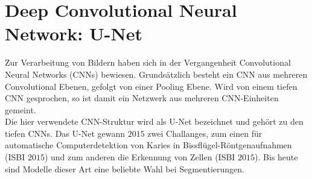 \section{Deep Convolutional Neural Network: U-Net}
\label{sec:Model}
Zur Verarbeitung von Bildern haben sich in der Vergangenheit Convolutional Neural Networks (CNNs) bewiesen.
Grundsätzlich besteht ein CNN aus mehreren Convolutional Ebenen, gefolgt von einer Pooling Ebene.
Wird von einem tiefen CNN gesprochen, so ist damit ein Netzwerk aus mehreren CNN-Einheiten gemeint.
\\
Die hier verwendete CNN-Struktur wird als U-Net bezeichnet und gehört zu den tiefen CNNs.
Das U-Net gewann $2015$ zwei Challanges, zum einen für automatische Computerdetektion von Karies in Bissflügel-Röntgenaufnahmen (ISBI $2015$) und zum anderen die Erkennung von Zellen (ISBI $2015$).\cite{RFB15a}
Bis heute sind Modelle dieser Art eine beliebte Wahl bei Segmentierungen.

